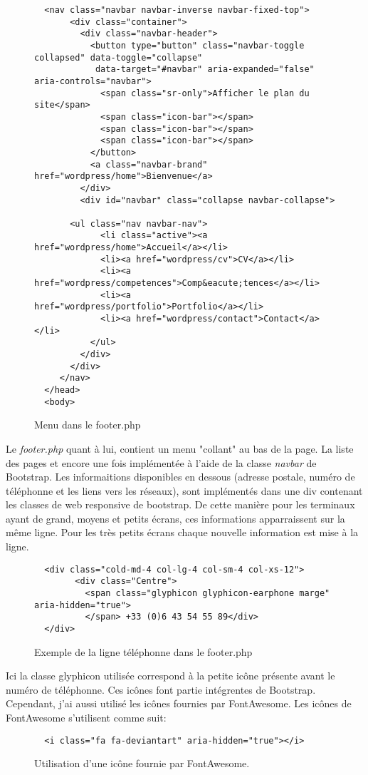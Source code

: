 \documentclass{article}
\begin{document}
\begin{figure}
\begin{Verbatim}
  <nav class="navbar navbar-inverse navbar-fixed-top">
       <div class="container">
         <div class="navbar-header">
           <button type="button" class="navbar-toggle collapsed" data-toggle="collapse"
            data-target="#navbar" aria-expanded="false" aria-controls="navbar">
             <span class="sr-only">Afficher le plan du site</span>
             <span class="icon-bar"></span>
             <span class="icon-bar"></span>
             <span class="icon-bar"></span>
           </button>
           <a class="navbar-brand" href="wordpress/home">Bienvenue</a>
         </div>
         <div id="navbar" class="collapse navbar-collapse">

  	   <ul class="nav navbar-nav">
             <li class="active"><a href="wordpress/home">Accueil</a></li>
             <li><a href="wordpress/cv">CV</a></li>
             <li><a href="wordpress/competences">Comp&eacute;tences</a></li>
             <li><a href="wordpress/portfolio">Portfolio</a></li>
             <li><a href="wordpress/contact">Contact</a></li>
           </ul>
         </div>
       </div>
     </nav>
  </head>
  <body>
\end{Verbatim}
\caption{Menu dans le footer.php}
\end{figure}

Le \textit{footer.php} quant à lui, contient un menu "collant" au bas de la page. La liste des pages et encore une fois implémentée à l'aide de la classe \textit{navbar} de Bootstrap. Les informaitions disponibles en dessous (adresse postale, numéro de téléphonne et les liens vers les réseaux), sont implémentés dans une div contenant les classes de web responsive de bootstrap. De cette manière pour les terminaux ayant de grand, moyens et petits écrans, ces informations apparraissent sur la même ligne. Pour les très petits écrans chaque nouvelle information est mise à la ligne.

\begin{figure}
\begin{Verbatim}
  <div class="cold-md-4 col-lg-4 col-sm-4 col-xs-12">
        <div class="Centre">
          <span class="glyphicon glyphicon-earphone marge" aria-hidden="true">
          </span> +33 (0)6 43 54 55 89</div>
  </div>
\end{Verbatim}
\caption{Exemple de la ligne téléphonne dans le footer.php}
\end{figure}

Ici la classe glyphicon utilisée correspond à la petite icône présente avant le numéro de téléphonne. Ces icônes font partie intégrentes de Bootstrap. Cependant, j'ai aussi utilisé les icônes fournies par FontAwesome. Les icônes de FontAwesome s'utilisent comme suit:
\begin{figure}
\begin{Verbatim}
  <i class="fa fa-deviantart" aria-hidden="true"></i>
\end{Verbatim}
\caption{Utilisation d'une icône fournie par FontAwesome.}
\end{figure}
\end{document}
